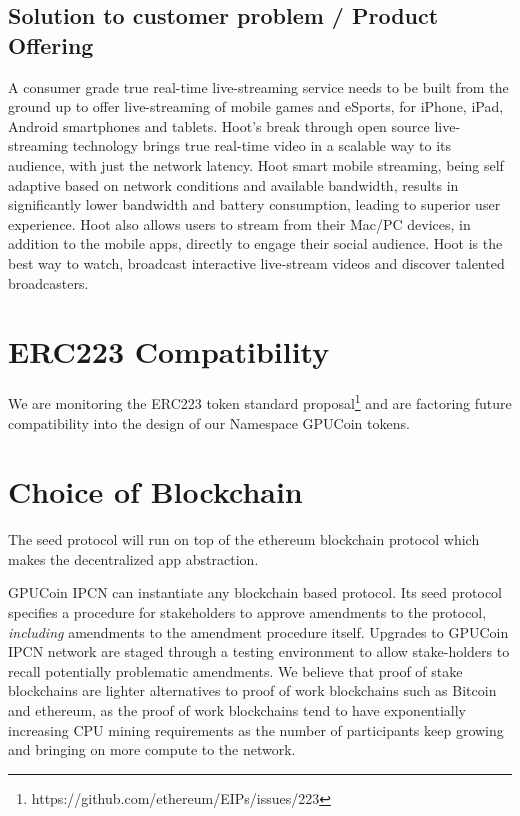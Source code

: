 \documentclass{article}
\begin{document}
\subsection{Solution to customer problem / Product Offering}
A consumer grade true real-time live-streaming service needs to be built from the ground up to offer live-streaming of mobile games and eSports, for iPhone, iPad, Android smartphones and tablets. Hoot's break through open source live-streaming technology brings true real-time video in a scalable way to its audience, with just the network latency. Hoot smart mobile streaming, being self adaptive based on network conditions and available bandwidth, results in significantly lower bandwidth and battery consumption, leading to superior user experience. Hoot also allows users to stream from their Mac/PC devices, in addition to the mobile apps, directly to engage their social audience. Hoot is the best way to watch, broadcast interactive live-stream videos and discover talented broadcasters.

%


\section{ERC223 Compatibility}
We are monitoring the ERC223 token standard proposal\footnote{https://github.com/ethereum/EIPs/issues/223} and are factoring future compatibility into the design of our Namespace GPUCoin tokens.

\section{Choice of Blockchain}
The seed protocol will run on top of the ethereum blockchain protocol which makes the decentralized app abstraction. 



GPUCoin IPCN can instantiate any blockchain based protocol. Its seed protocol specifies a procedure for stakeholders to approve amendments to the protocol, \emph{including} amendments to the amendment procedure itself. Upgrades to GPUCoin IPCN network are staged through a testing environment to allow stake-holders to recall potentially problematic amendments. We believe that proof of stake blockchains are lighter alternatives to proof of work blockchains such as Bitcoin and ethereum, as the proof of work blockchains tend to have exponentially increasing CPU mining requirements as the number of participants keep growing and bringing on more compute to the network.
\end{document}
